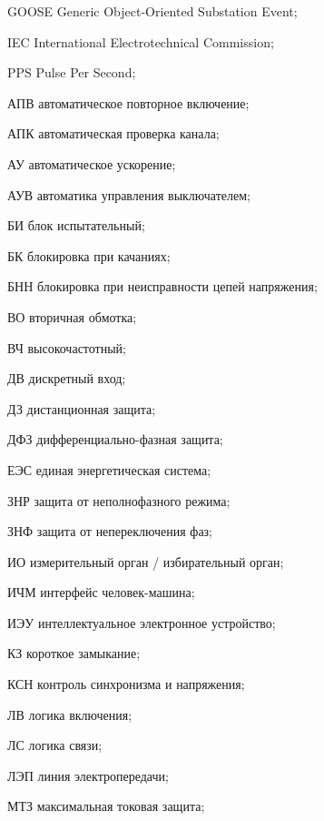\begin{list}{}%
{%
  \setlength{\labelwidth}{\abbrwidth}%
  \setlength{\labelsep}{0pt}%
  \setlength{\leftmargin}{\dimexpr\labelwidth+\labelsep\relax}%
  \setlength{\itemindent}{0pt}%
  \setlength{\parsep}{0pt}%
  \setlength{\itemsep}{0pt}
  \renewcommand{\makelabel}[1]{#1 --\hspace{\abbrgap}}%
}
\item[GOOSE] Generic Object-Oriented Substation Event;
\item[IEC]  International Electrotechnical Commission;
\item[PPS] Pulse Per Second;
\item[АПВ] автоматическое повторное включение;
\item[АПК] автоматическая проверка канала;
\item[АУ] автоматическое ускорение;
\item[АУВ] автоматика управления выключателем;
\item[БИ] блок испытательный;
\item[БК] блокировка при качаниях;
\item[БНН] блокировка при неисправности цепей напряжения;
\item[ВО] вторичная обмотка;
\item[ВЧ] высокочастотный;
\item[ДВ] дискретный вход;
\item[ДЗ] дистанционная защита;
\item[ДФЗ] дифференциально-фазная защита;
\item[ЕЭС] единая энергетическая система;
\item[ЗНР] защита от неполнофазного режима;
\item[ЗНФ] защита от непереключения фаз;
\item[ИО] измерительный орган / избирательный орган;
\item[ИЧМ] интерфейс человек-машина;
\item[ИЭУ] интеллектуальное электронное устройство;
\item[КЗ] короткое замыкание;
\item[КСН] контроль синхронизма и напряжения;
\item[ЛВ] логика включения;
\item[ЛС] логика связи;
\item[ЛЭП] линия электропередачи;
\item[МТЗ] максимальная токовая защита;

\end{list}
